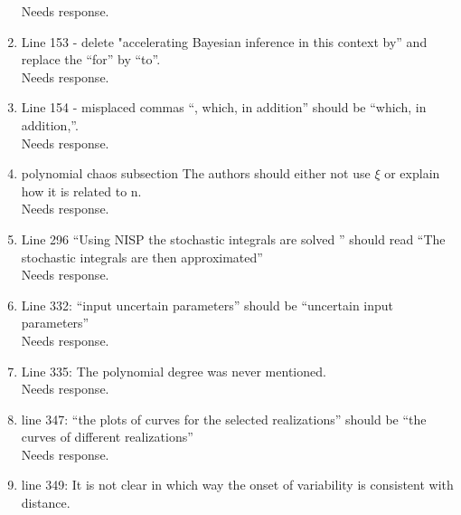 \documentclass[]{article}
\newcommand{\alert}[1]{{\color{red} #1}}
\begin{document}
\begin{enumerate}
\alert{Needs response.} \\

\item Line 153 - delete "accelerating Bayesian inference in this context by” and replace the ``for'' by ``to''. \\

\alert{Needs response.} \\

\item Line 154 - misplaced commas ``, which, in addition'' should be ``which, in addition,''. \\

\alert{Needs response.} \\

\item polynomial chaos subsection The authors should either not use $\xi$ or explain how it is related to n. \\

\alert{Needs response.} \\

\item Line 296 ``Using NISP the stochastic integrals are solved '' should read ``The stochastic integrals are then approximated'' \\

\alert{Needs response.} \\

\item Line 332: ``input uncertain parameters'' should be ``uncertain input parameters'' \\

\alert{Needs response.} \\

\item Line 335: The polynomial degree was never mentioned. \\

\alert{Needs response.} \\

\item line 347: ``the plots of curves for the selected realizations'' should be ``the curves of different realizations'' \\

\alert{Needs response.} \\

\item line 349: It is not clear in which way the onset of variability is consistent with distance. \\


\end{enumerate}
\end{document}
